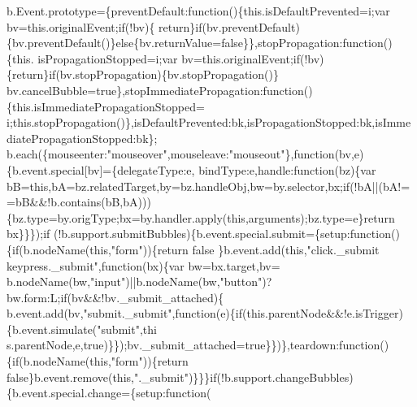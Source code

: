 \begin{DoxyCode}
      b.Event.prototype=\{preventDefault:\textcolor{keyword}{function}()\{this.isDefaultPrevented=i;var bv=this.originalEvent;\textcolor{keywordflow}{if}(!bv)\{\textcolor{keywordflow}{
      return}\}\textcolor{keywordflow}{if}(bv.preventDefault)\{bv.preventDefault()\}\textcolor{keywordflow}{else}\{bv.returnValue=\textcolor{keyword}{false}\}\},stopPropagation:\textcolor{keyword}{function}()\{this.
      isPropagationStopped=i;var bv=this.originalEvent;\textcolor{keywordflow}{if}(!bv)\{\textcolor{keywordflow}{return}\}\textcolor{keywordflow}{if}(bv.stopPropagation)\{bv.stopPropagation()\}
      bv.cancelBubble=\textcolor{keyword}{true}\},stopImmediatePropagation:\textcolor{keyword}{function}()\{this.isImmediatePropagationStopped=
      i;this.stopPropagation()\},isDefaultPrevented:bk,isPropagationStopped:bk,isImmediatePropagationStopped:bk\};
      b.each(\{mouseenter:\textcolor{stringliteral}{"mouseover"},mouseleave:\textcolor{stringliteral}{"mouseout"}\},\textcolor{keyword}{function}(bv,e)\{b.event.special[bv]=\{delegateType:e,
      bindType:e,handle:\textcolor{keyword}{function}(bz)\{var bB=\textcolor{keyword}{this},bA=bz.relatedTarget,by=bz.handleObj,bw=by.selector,bx;\textcolor{keywordflow}{if}(!bA||(bA!=
      =bB&&!b.contains(bB,bA)))\{bz.type=by.origType;bx=by.handler.apply(\textcolor{keyword}{this},arguments);bz.type=e\}\textcolor{keywordflow}{return} bx\}\}\});\textcolor{keywordflow}{if}
      (!b.support.submitBubbles)\{b.event.special.submit=\{setup:\textcolor{keyword}{function}()\{\textcolor{keywordflow}{if}(b.nodeName(\textcolor{keyword}{this},\textcolor{stringliteral}{"form"}))\{\textcolor{keywordflow}{return} \textcolor{keyword}{false}
      \}b.event.add(\textcolor{keyword}{this},\textcolor{stringliteral}{"click.\_submit keypress.\_submit"},\textcolor{keyword}{function}(bx)\{var bw=bx.target,bv=
      b.nodeName(bw,\textcolor{stringliteral}{"input"})||b.nodeName(bw,\textcolor{stringliteral}{"button"})?bw.form:L;\textcolor{keywordflow}{if}(bv&&!bv.\_submit\_attached)\{
      b.event.add(bv,\textcolor{stringliteral}{"submit.\_submit"},\textcolor{keyword}{function}(e)\{\textcolor{keywordflow}{if}(this.parentNode&&!e.isTrigger)\{b.event.simulate(\textcolor{stringliteral}{"submit"},thi
      s.parentNode,e,true)\}\});bv.\_submit\_attached=\textcolor{keyword}{true}\}\})\},teardown:\textcolor{keyword}{function}()\{\textcolor{keywordflow}{if}(b.nodeName(\textcolor{keyword}{this},\textcolor{stringliteral}{"form"}))\{\textcolor{keywordflow}{return} \textcolor{keyword}{
      false}\}b.event.remove(\textcolor{keyword}{this},\textcolor{stringliteral}{".\_submit"})\}\}\}\textcolor{keywordflow}{if}(!b.support.changeBubbles)\{b.event.special.change=\{setup:\textcolor{keyword}{function}(

\end{DoxyCode}
